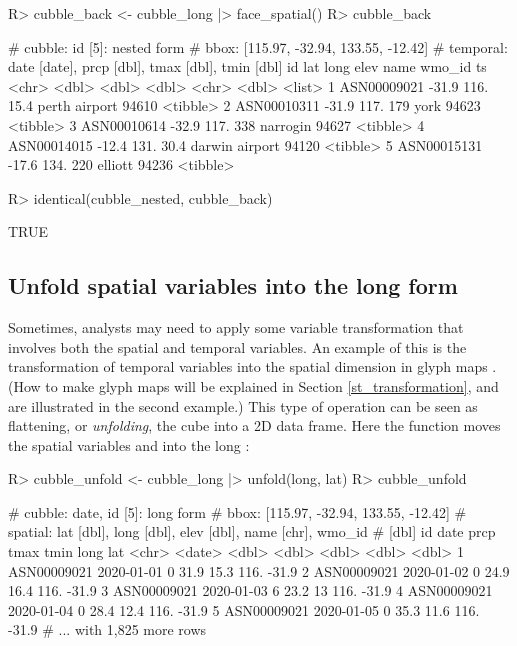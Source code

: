\documentclass[
  shortnames]{jss}
\begin{document}
\begin{CodeChunk}
\begin{CodeInput}
R> cubble_back <- cubble_long |> face_spatial()
R> cubble_back
\end{CodeInput}
\begin{CodeOutput}
# cubble:   id [5]: nested form
# bbox:     [115.97, -32.94, 133.55, -12.42]
# temporal: date [date], prcp [dbl], tmax [dbl], tmin [dbl]
  id            lat  long  elev name           wmo_id ts      
  <chr>       <dbl> <dbl> <dbl> <chr>           <dbl> <list>  
1 ASN00009021 -31.9  116.  15.4 perth airport   94610 <tibble>
2 ASN00010311 -31.9  117. 179   york            94623 <tibble>
3 ASN00010614 -32.9  117. 338   narrogin        94627 <tibble>
4 ASN00014015 -12.4  131.  30.4 darwin airport  94120 <tibble>
5 ASN00015131 -17.6  134. 220   elliott         94236 <tibble>
\end{CodeOutput}
\begin{CodeInput}
R> identical(cubble_nested, cubble_back)
\end{CodeInput}
\begin{CodeOutput}
[1] TRUE
\end{CodeOutput}
\end{CodeChunk}

\hypertarget{unfold}{%
\subsection{Unfold spatial variables into the long form}\label{unfold}}

Sometimes, analysts may need to apply some variable transformation that involves both the spatial and temporal variables. An example of this is the transformation of temporal variables into the spatial dimension in glyph maps \citep{Wickham2012-yr}. (How to make glyph maps will be explained in Section \ref{st_transformation}, and are illustrated in the second example.) This type of operation can be seen as flattening, or \emph{unfolding}, the cube into a 2D data frame. Here the function  moves the spatial variables  and  into the long :

\begin{CodeChunk}
\begin{CodeInput}
R> cubble_unfold <- cubble_long |> unfold(long, lat)
R> cubble_unfold
\end{CodeInput}
\begin{CodeOutput}
# cubble:  date, id [5]: long form
# bbox:    [115.97, -32.94, 133.55, -12.42]
# spatial: lat [dbl], long [dbl], elev [dbl], name [chr], wmo_id
#   [dbl]
  id          date        prcp  tmax  tmin  long   lat
  <chr>       <date>     <dbl> <dbl> <dbl> <dbl> <dbl>
1 ASN00009021 2020-01-01     0  31.9  15.3  116. -31.9
2 ASN00009021 2020-01-02     0  24.9  16.4  116. -31.9
3 ASN00009021 2020-01-03     6  23.2  13    116. -31.9
4 ASN00009021 2020-01-04     0  28.4  12.4  116. -31.9
5 ASN00009021 2020-01-05     0  35.3  11.6  116. -31.9
# ... with 1,825 more rows
\end{CodeOutput}
\end{CodeChunk}
\end{document}
